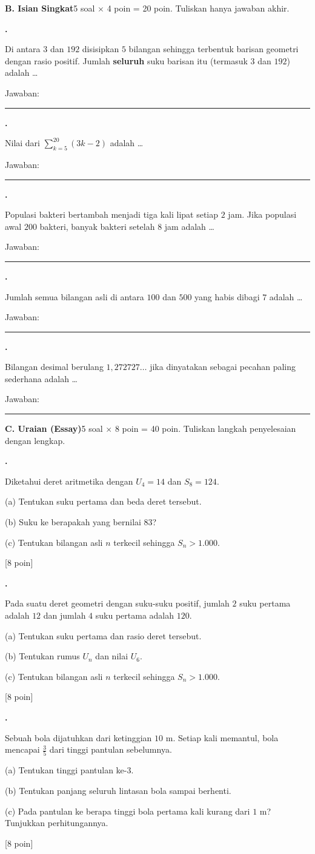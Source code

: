 \documentclass[a4paper,11pt]{article}
\newcommand{\dis}{\displaystyle}
\newcounter{no}
\newcommand{\bagian}[2]{\par\Needspace{6\baselineskip}\vspace{1.0em}\noindent
  \begin{tcolorbox}[colback=navy,colframe=navy,coltext=white,boxrule=0pt,arc=2pt,left=6pt,right=6pt,top=3pt,bottom=3pt]
  \textbf{#1}\hfill{\small #2}\end{tcolorbox}\setcounter{no}{0}\par\vspace{-0.3em}}
\newcommand{\soal}[2]{\par\vspace{0.75em}\stepcounter{no}\noindent
  \begin{minipage}[t]{1.8em}\textbf{\theno.}\end{minipage}%
  \begin{minipage}[t]{\dimexpr\linewidth-1.8em\relax}#1\par\vspace{0.35em}#2\end{minipage}\par}
\newcommand{\poin}[1]{\hfill{\small\color{navy}[#1 poin]}}
\begin{document}
\bagian{B. Isian Singkat}{5 soal $\times$ 4 poin = 20 poin. Tuliskan hanya jawaban akhir.}
\soal{Di antara $3$ dan $192$ disisipkan $5$ bilangan sehingga terbentuk barisan geometri dengan rasio positif. Jumlah \textbf{seluruh} suku barisan itu (termasuk $3$ dan $192$) adalah \dots}{\hfill Jawaban: \rule{4.5cm}{0.4pt}}
\soal{Nilai dari $\dis\sum_{k=5}^{20}(3k-2)$ adalah \dots}{\hfill Jawaban: \rule{4.5cm}{0.4pt}}
\soal{Populasi bakteri bertambah menjadi tiga kali lipat setiap $2$ jam. Jika populasi awal $200$ bakteri, banyak bakteri setelah $8$ jam adalah \dots}{\hfill Jawaban: \rule{4.5cm}{0.4pt}}
\soal{Jumlah semua bilangan asli di antara $100$ dan $500$ yang habis dibagi $7$ adalah \dots}{\hfill Jawaban: \rule{4.5cm}{0.4pt}}
\soal{Bilangan desimal berulang $1{,}272727\ldots$ jika dinyatakan sebagai pecahan paling sederhana adalah \dots}{\hfill Jawaban: \rule{4.5cm}{0.4pt}}
\bagian{C. Uraian (Essay)}{5 soal $\times$ 8 poin = 40 poin. Tuliskan langkah penyelesaian dengan lengkap.}
\soal{Diketahui deret aritmetika dengan $U_4=14$ dan $S_8=124$.\par\smallskip\hspace*{0.3em}(a) Tentukan suku pertama dan beda deret tersebut.\par\hspace*{0.3em}(b) Suku ke berapakah yang bernilai $83$?\par\hspace*{0.3em}(c) Tentukan bilangan asli $n$ terkecil sehingga $S_n>1.000$.}{\poin{8}}
\soal{Pada suatu deret geometri dengan suku-suku positif, jumlah $2$ suku pertama adalah $12$ dan jumlah $4$ suku pertama adalah $120$.\par\smallskip\hspace*{0.3em}(a) Tentukan suku pertama dan rasio deret tersebut.\par\hspace*{0.3em}(b) Tentukan rumus $U_n$ dan nilai $U_6$.\par\hspace*{0.3em}(c) Tentukan bilangan asli $n$ terkecil sehingga $S_n>1.000$.}{\poin{8}}
\soal{Sebuah bola dijatuhkan dari ketinggian $10$ m. Setiap kali memantul, bola mencapai $\dis\frac35$ dari tinggi pantulan sebelumnya.\par\smallskip\hspace*{0.3em}(a) Tentukan tinggi pantulan ke-$3$.\par\hspace*{0.3em}(b) Tentukan panjang seluruh lintasan bola sampai berhenti.\par\hspace*{0.3em}(c) Pada pantulan ke berapa tinggi bola pertama kali kurang dari $1$ m? Tunjukkan perhitungannya.}{\poin{8}}
\end{document}
